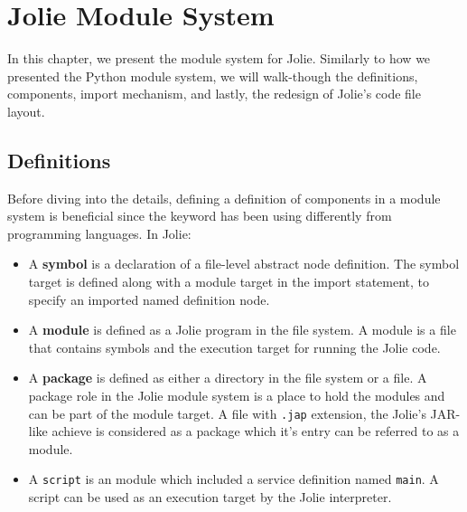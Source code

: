 \chapter{Jolie Module System}

In this chapter, we present the module system for Jolie.
Similarly to how we presented the Python module system, we will walk-though the definitions, components, import mechanism, and lastly, the redesign of Jolie's code file layout.

\section{Definitions}

Before diving into the details, defining a definition of components in a module system is beneficial since the keyword has been using differently from programming languages. In Jolie:

\begin{itemize}
      \item
            A \textbf{symbol} is a declaration of a file-level abstract node definition. The symbol target is defined along with a module target in the import statement, to specify an imported named definition node.
      \item
            A \textbf{module} is defined as a Jolie program in the file system. A module is a file that contains symbols and the execution target for running the Jolie code.
      \item
            A \textbf{package} is defined as either a directory in the file system or a file. A package role in the Jolie module system is a place to hold the modules and can be part of the module target. A file with \texttt{.jap} extension, the Jolie's JAR-like achieve is considered as a package which it's entry can be referred to as a module.
      \item
            A \texttt{script} is an module which included a service definition named \texttt{main}. A script can be used as an execution target by the Jolie interpreter. 
\end{itemize}











